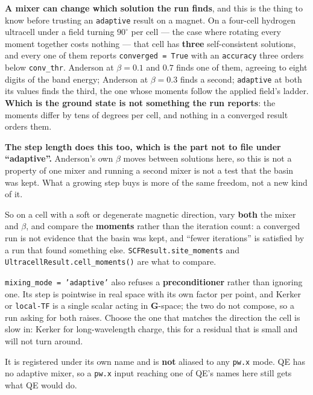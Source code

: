 \documentclass[11pt,a4paper]{article}
\newcommand{\code}[1]{\texttt{\small #1}}
\begin{document}
\begin{refuses}
\textbf{A mixer can change which solution the run finds}, and this is the thing
to know before trusting an \code{adaptive} result on a magnet. On a four-cell
hydrogen ultracell under a field turning $90^\circ$ per cell --- the case where
rotating every moment together costs nothing --- that cell has \textbf{three}
self-consistent solutions, and every one of them reports
\code{converged = True} with an \code{accuracy} three orders below
\code{conv\_thr}. Anderson at $\beta = 0.1$ and $0.7$ finds one of them, agreeing
to eight digits of the band energy; Anderson at $\beta = 0.3$ finds a second;
\code{adaptive} at both its values finds the third, the one whose moments follow
the applied field's ladder. \textbf{Which is the ground state is not something
the run reports}: the moments differ by tens of degrees per cell, and nothing in
a converged result orders them.

\textbf{The step length does this too, which is the part not to file under
``adaptive''.} Anderson's own $\beta$ moves between solutions here, so this is
not a property of one mixer and running a second mixer is not a test that the
basin was kept. What a growing step buys is more of the same freedom, not a new
kind of it.

So on a cell with a soft or degenerate magnetic direction, vary
\textbf{both} the mixer and $\beta$, and compare the \textbf{moments} rather
than the iteration count: a converged run is not evidence that the basin was
kept, and ``fewer iterations'' is satisfied by a run that found something else.
\code{SCFResult.site\_moments} and \code{UltracellResult.cell\_moments()} are
what to compare.

\code{mixing\_mode = 'adaptive'} also refuses a \textbf{preconditioner} rather
than ignoring one. Its step is pointwise in real space with its own factor per point,
and Kerker or \code{local-TF} is a single scalar acting in $\mathbf G$-space; the
two do not compose, so a run asking for both raises. Choose the one that matches
the direction the cell is slow in: Kerker for long-wavelength charge, this for a
residual that is small and will not turn around.

It is registered under its own name and is \textbf{not} aliased to any
\code{pw.x} mode. QE has no adaptive mixer, so a \code{pw.x} input reaching one
of QE's names here still gets what QE would do.
\end{refuses}
\end{document}
